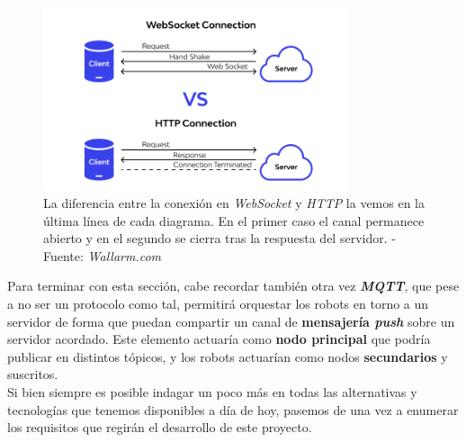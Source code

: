 \begin{figure}[h]
	\centering
	\includegraphics[width=0.8\textwidth]{imagenes/ws_vs_http.png}
	\caption{La diferencia entre la conexión en \textit{WebSocket} y \textit{HTTP} la vemos en la última línea de cada diagrama. En el primer caso el canal permanece abierto y en el segundo se cierra tras la respuesta del servidor. - Fuente: \textit{Wallarm.com} \cite{ws_connection}}
\end{figure}

Para terminar con esta sección, cabe recordar también otra vez \textbf{\textit{MQTT}}, que pese a no ser un protocolo como tal, permitirá orquestar los robots en torno a un servidor de forma que puedan compartir un canal de \textbf{mensajería \textit{push}} sobre un servidor acordado. Este elemento actuaría como \textbf{nodo principal} que podría publicar en distintos tópicos, y los robots actuarían como nodos \textbf{secundarios} y suscritos.\\

Si bien siempre es posible indagar un poco más en todas las alternativas y tecnologías que tenemos disponibles a día de hoy, pasemos de una vez a enumerar los requisitos que regirán el desarrollo de este proyecto.\\















